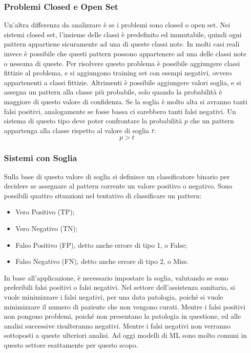 \documentclass{article}
\numberwithin{equation}{subsection}
\begin{document}

\subsubsection{Problemi Closed e Open Set}

Un'altra differenza da analizzare è se i problemi sono closed o open set. Nei sistemi closed set, l'insieme delle classi è predefinito ed immutabile, quindi ogni pattern appartiene 
sicuramente ad una di queste classi note. In molti casi reali invece è possibile che 
questi pattern possono appartenere ad una delle classi note o nessuna di queste. 
Per risolvere questo problema è possibile aggiungere classi fittizie al problema, e si 
aggiungono training set con esempi negativi, ovvero appartenenti a classi fittizie. Altrimenti è possibile aggiungere valori soglia, e si assegna un pattern alla classe più probabile, solo quando la probabilità è maggiore di questo valore di confidenza. Se la soglia è molto alta si avranno tanti falsi positivi, analogamente se fosse bassa ci sarebbero tanti falsi negativi. 
Un sistema di questo tipo deve poter confrontare la probabilità $p$ che un pattern appartenga alla classe rispetto al valore di soglia $t$:
\begin{equation*}
    p>t
\end{equation*}

\subsubsection{Sistemi con Soglia}

Sulla base di questo valore di soglia si definisce un classificatore binario per decidere se 
assegnare al pattern corrente un valore positivo o negativo. Sono possibili quattro situazioni nel tentativo di classificare un pattern:
\begin{itemize}
    \item Vero Positivo (TP);
    \item Vero Negativo (TN);
    \item Falso Positivo (FP), detto anche errore di tipo 1, o False;
    \item Falso Negativo (FN), detto anche errore di tipo 2, o Miss. 
\end{itemize}

In base all'applicazione, è necessario impostare la soglia, valutando se sono preferibili 
falsi positivi o falsi negativi. Nel settore dell'assistenza sanitaria, si vuole minimizzare i falsi negativi, per una data patologia, poiché si vuole minimizzare il numero di paziente 
che non vengono curati. Mentre i falsi positivi non pongono problemi, poiché non presentano 
la patologia in questione, ed alle analisi successive risulteranno negativi. Mentre i falsi 
negativi non verranno sottoposti a queste ulteriori analisi. 
Ad oggi modelli di ML sono molto comuni in questo settore esattamente per questo scopo. 
\end{document}
